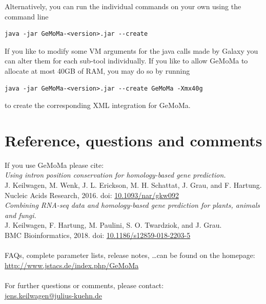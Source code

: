 \documentclass{article}
\begin{document}
Alternatively, you can run the individual commands on your own using the command line
\begin{verbatim}
java -jar GeMoMa-<version>.jar --create
\end{verbatim}
If you like to modify some VM arguments for the java calls made by Galaxy you can alter them for each sub-tool individually. If you like to allow GeMoMa to allocate at most 40GB of RAM, you may do so by running
\begin{verbatim}
java -jar GeMoMa-<version>.jar --create GeMoMa -Xmx40g
\end{verbatim}
to create the corresponding XML integration for GeMoMa.

\section{Reference, questions and comments}
If you use GeMoMa please cite:\\[\medskipamount]
\emph{Using intron position conservation for homology-based gene prediction.}\\
J. Keilwagen, M. Wenk, J. L. Erickson, M. H. Schattat, J. Grau, and F. Hartung.\\
Nucleic Acids Research, 2016. doi: \href{https://doi.org/10.1093/nar/gkw092}{10.1093/nar/gkw092}\\[\medskipamount]
\emph{Combining RNA-seq data and homology-based gene prediction for plants, animals and fungi.}\\
J. Keilwagen, F. Hartung, M. Paulini, S. O. Twardziok, and J. Grau.\\
BMC Bioinformatics, 2018. doi: \href{https://doi.org/10.1186/s12859-018-2203-5}{10.1186/s12859-018-2203-5}\\
~\\
FAQs, complete parameter lists, release notes, \ldots can be found on the homepage: 
\url{http://www.jstacs.de/index.php/GeMoMa}\\
~\\
For further questions or comments, please contact:\\
\href{mailto:jens.keilwagen@julius-kuehn.de?subject=GeMoMa manual}{jens.keilwagen@julius-kuehn.de}
\end{document}
